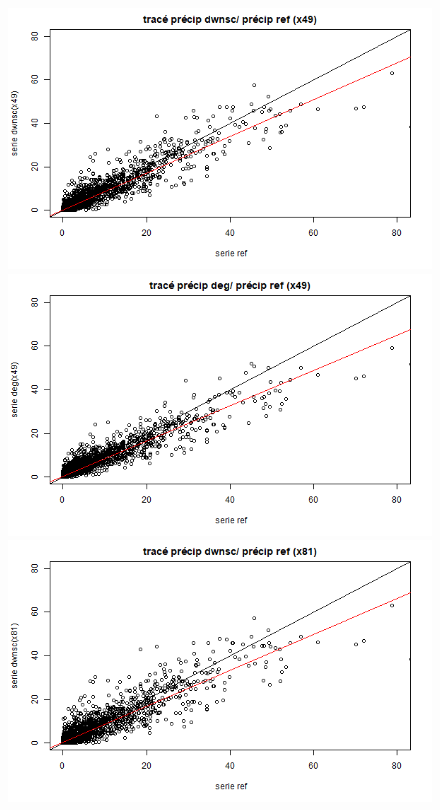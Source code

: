 \documentclass[a4paper,11pt]{article}
\numberwithin{equation}{section}
\begin{document}
\begin{figure}[H]
	\begin{minipage}[b]{0.4\linewidth}
		\centering \includegraphics[scale=0.4]{images/pr_3_ds_QQ.png}
	\end{minipage}\hfill
	\begin{minipage}[b]{0.4\linewidth}	
		\centering \includegraphics[scale=0.4]{images/pr_3_dg.png}
	\end{minipage}
	\begin{minipage}[b]{0.4\linewidth}
		\centering \includegraphics[scale=0.4]{images/pr_4_ds_QQ.png}

\end{minipage}
\end{figure}
\end{document}

